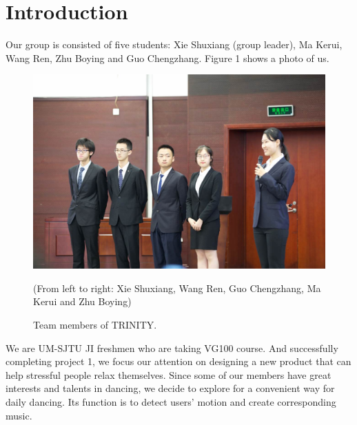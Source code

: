 \section{Introduction}
\par Our group is consisted of five students: Xie Shuxiang (group leader), Ma
Kerui, Wang Ren, Zhu Boying and Guo Chengzhang. Figure 1 shows a photo of us. 
\begin{figure}
    \centering
    \includegraphics[width=5in]{Pics/groupSym}
    \caption{Team members of TRINITY.}
    (From left to right: Xie Shuxiang, Wang Ren, Guo Chengzhang, Ma Kerui and
    Zhu Boying) 
\end{figure}

\par We are UM-SJTU JI freshmen who are taking VG100 course. And successfully
completing project 1, we focus our attention on designing a new product that can
help stressful people relax themselves. Since some of our members have great
interests and talents in dancing, we decide to explore for a convenient way for
daily dancing. Its function is to detect users' motion and create corresponding
music.